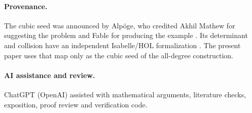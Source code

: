 \paragraph{Provenance.}
The cubic seed was announced by Alp\"oge, who credited Akhil Mathew for
suggesting the problem and Fable for producing the example \cite{Alpoge}.
Its determinant and collision have an independent Isabelle/HOL formalization
\cite{IsabelleAFP}.  The present paper uses that map only as the cubic seed
of the all-degree construction.

\paragraph{AI assistance and review.}
ChatGPT (OpenAI) assisted with mathematical arguments, literature checks,
exposition, proof review and verification code.
